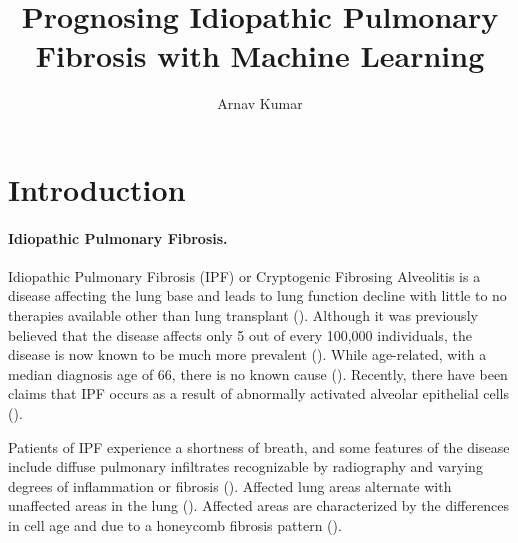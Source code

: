 \documentclass[12pt]{article}
\title{Prognosing Idiopathic Pulmonary Fibrosis with Machine Learning}
\author{Arnav Kumar}
\begin{document}
\maketitle
\thispagestyle{fancy}

\section{Introduction}

\paragraph*{Idiopathic Pulmonary Fibrosis.}

Idiopathic Pulmonary Fibrosis (IPF) or Cryptogenic Fibrosing Alveolitis is a disease affecting the lung base and leads to lung function decline with little to no therapies available other than lung transplant (\cite{mason1999pharmacological,gross2001idiopathic}). 
Although it was previously believed that the disease affects only 5 out of every 100,000 individuals, the disease is now known to be much more prevalent (\cite{coultas1994epidemiology,mason1999pharmacological,raghu2018diagnosis}). 
While age-related, with a median diagnosis age of 66, there is no known cause (\cite{king2011idiopathic,raghu2018diagnosis}).
Recently, there have been claims that IPF occurs as a result of abnormally activated alveolar epithelial cells (\cite{king2011idiopathic}).

Patients of IPF experience a shortness of breath, and some features of the disease include diffuse pulmonary infiltrates recognizable by radiography and varying degrees of inflammation or fibrosis (\cite{gross2001idiopathic}). 
Affected lung areas alternate with unaffected areas in the lung (\cite{gross2001idiopathic}).
Affected areas are characterized by the differences in cell age and due to a honeycomb fibrosis pattern (\cite{gross2001idiopathic}).
\end{document}

